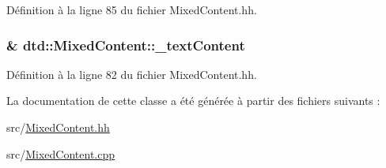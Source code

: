 Définition à la ligne 85 du fichier MixedContent.hh.

\hypertarget{classdtd_1_1_mixed_content_af8e3d219de7501a3cd397e913be22f2f}{
\subsubsection[{\_\-textContent}]{\& {\bf dtd::MixedContent::\_\-textContent}}}
\label{classdtd_1_1_mixed_content_af8e3d219de7501a3cd397e913be22f2f}


Définition à la ligne 82 du fichier MixedContent.hh.



La documentation de cette classe a été générée à partir des fichiers suivants :\begin{DoxyCompactItemize}
\item 
src/\hyperlink{_mixed_content_8hh}{MixedContent.hh}\item 
src/\hyperlink{_mixed_content_8cpp}{MixedContent.cpp}\end{DoxyCompactItemize}
